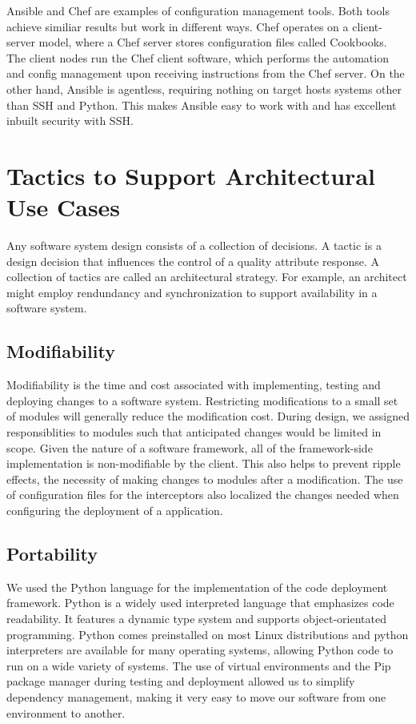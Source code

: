 Ansible and Chef are examples of configuration management tools. Both tools achieve similiar results but work in different ways. Chef operates on a client-server model, where a Chef server stores configuration files called Cookbooks. The client nodes run the Chef client software, which performs the automation and config management upon receiving instructions from the Chef server. On the other hand, Ansible is agentless, requiring nothing on target hosts systems other than SSH and Python. This makes Ansible easy to work with and has excellent inbuilt security with SSH.


\section{Tactics to Support Architectural Use Cases}

Any software system design consists of a collection of decisions. A tactic is a design decision that influences the control of a quality attribute response. A collection of tactics are called an architectural strategy. For example, an architect might employ rendundancy and synchronization to support availability in a software system. \cite{sw-arch-2}

\subsection{Modifiability}
Modifiability is the time and cost associated with implementing, testing and deploying changes to a software system. Restricting modifications to a small set of modules will generally reduce the modification cost. During design, we assigned responsiblities to modules such that anticipated changes would be limited in scope. Given the nature of a software framework, all of the framework-side implementation is non-modifiable by the client. This also helps to prevent ripple effects, the necessity of making changes to modules after a modification. The use of configuration files for the interceptors also localized the changes needed when configuring the deployment of a application.

\subsection{Portability}
We used the Python language for the implementation of the code deployment framework. Python is a widely used interpreted language that emphasizes code readability. It features a dynamic type system and supports object-orientated programming. Python comes preinstalled on most Linux distributions and python interpreters are available for many operating systems, allowing Python code to run on a wide variety of systems. The use of virtual environments and the Pip package manager during testing and deployment allowed us to simplify dependency management, making it very easy to move our software from one environment to another.

